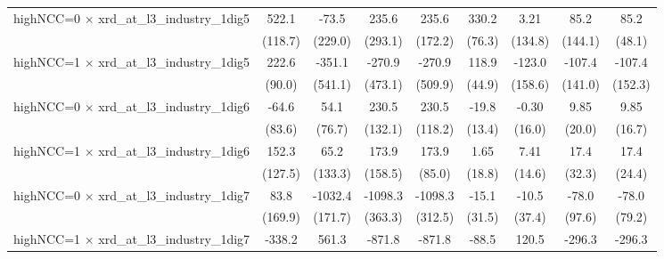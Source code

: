 {\begin{tabular}{l*{8}{c}}
highNCC=0 $\times$ xrd\_at\_l3\_industry\_1dig5&       522.1\sym{***}&       -73.5         &       235.6         &       235.6         &       330.2\sym{***}&        3.21         &        85.2         &        85.2\sym{*}  \\
                    &     (118.7)         &     (229.0)         &     (293.1)         &     (172.2)         &      (76.3)         &     (134.8)         &     (144.1)         &      (48.1)         \\
\addlinespace
highNCC=1 $\times$ xrd\_at\_l3\_industry\_1dig5&       222.6\sym{**} &      -351.1         &      -270.9         &      -270.9         &       118.9\sym{***}&      -123.0         &      -107.4         &      -107.4         \\
                    &      (90.0)         &     (541.1)         &     (473.1)         &     (509.9)         &      (44.9)         &     (158.6)         &     (141.0)         &     (152.3)         \\
\addlinespace
highNCC=0 $\times$ xrd\_at\_l3\_industry\_1dig6&       -64.6         &        54.1         &       230.5\sym{*}  &       230.5\sym{*}  &       -19.8         &       -0.30         &        9.85         &        9.85         \\
                    &      (83.6)         &      (76.7)         &     (132.1)         &     (118.2)         &      (13.4)         &      (16.0)         &      (20.0)         &      (16.7)         \\
\addlinespace
highNCC=1 $\times$ xrd\_at\_l3\_industry\_1dig6&       152.3         &        65.2         &       173.9         &       173.9\sym{**} &        1.65         &        7.41         &        17.4         &        17.4         \\
                    &     (127.5)         &     (133.3)         &     (158.5)         &      (85.0)         &      (18.8)         &      (14.6)         &      (32.3)         &      (24.4)         \\
\addlinespace
highNCC=0 $\times$ xrd\_at\_l3\_industry\_1dig7&        83.8         &     -1032.4\sym{***}&     -1098.3\sym{***}&     -1098.3\sym{***}&       -15.1         &       -10.5         &       -78.0         &       -78.0         \\
                    &     (169.9)         &     (171.7)         &     (363.3)         &     (312.5)         &      (31.5)         &      (37.4)         &      (97.6)         &      (79.2)         \\
\addlinespace
highNCC=1 $\times$ xrd\_at\_l3\_industry\_1dig7&      -338.2         &       561.3\sym{*}  &      -871.8         &      -871.8         &       -88.5\sym{*}  &       120.5         &      -296.3         &      -296.3         \\

\end{tabular}}
